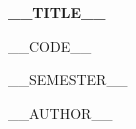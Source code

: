\documentclass[12pt,a4paper]{report}
\newcommand{\coursetitle}{__TITLE__}
\newcommand{\coursecode}{__CODE__}
\newcommand{\semester}{__SEMESTER__}
\newcommand{\authorname}{__AUTHOR__}
\begin{document}
\begin{titlepage}
  \centering
  \vspace*{4cm}
  {\Huge\titlefont\bfseries\color{accent}\coursetitle\par}
  \vspace{1cm}
  {\Large\titlefont\coursecode\par}
  \vspace{0.5cm}
  {\large\titlefont\semester\par}
  \vfill
  {\large\titlefont\authorname\par}
  \vspace{1cm}
\end{titlepage}

\tableofcontents

\end{document}
